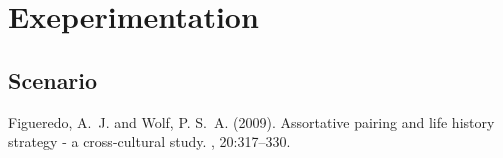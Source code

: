 \documentclass[twoside,twocolumn]{article}
\begin{document}



\section{Exeperimentation}

\subsection{Scenario}





\begin{thebibliography}{99} %

Figueredo, A.~J. and Wolf, P. S.~A. (2009).
\newblock Assortative pairing and life history strategy - a cross-cultural
  study.
, 20:317--330.

\end{thebibliography}

\end{document}
